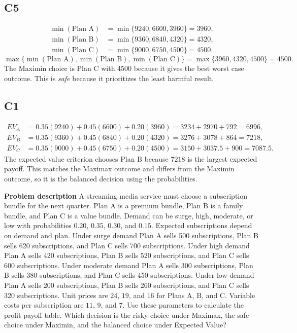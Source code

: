 \begin{ExamProblems}
		\subsection*{C5}
		\[
		\begin{aligned}
		\min(\text{Plan A}) &= \min\{9240,6600,3960\} = 3960,\\
		\min(\text{Plan B}) &= \min\{9360,6840,4320\} = 4320,\\
		\min(\text{Plan C}) &= \min\{9000,6750,4500\} = 4500.
		\end{aligned}
		\]
		\[
		\max\{\min(\text{Plan A}), \min(\text{Plan B}), \min(\text{Plan C})\}
		= \max\{3960, 4320, 4500\}
		= 4500.
		\]
		The Maximin choice is Plan C with 4500 because it gives the best worst case outcome. This is \emph{safe} because it prioritizes the least harmful result.

		\subsection*{C1}
		\[
		\begin{aligned}
		EV_A &= 0.35(9240)+0.45(6600)+0.20(3960)=3234+2970+792=6996,\\
		EV_B &= 0.35(9360)+0.45(6840)+0.20(4320)=3276+3078+864=7218,\\
		EV_C &= 0.35(9000)+0.45(6750)+0.20(4500)=3150+3037.5+900=7087.5.
		\end{aligned}
		\]
			The expected value criterion chooses Plan B because $7218$ is the largest expected payoff. This matches the Maximax outcome and differs from the Maximin outcome, so it is the balanced decision using the probabilities.
	
			\item
			\textbf{Problem description}
			A streaming media service must choose a subscription bundle for the next quarter. Plan A is a premium bundle, Plan B is a family bundle, and Plan C is a value bundle. Demand can be surge, high, moderate, or low with probabilities $0.20$, $0.35$, $0.30$, and $0.15$. Expected subscriptions depend on demand and plan. Under surge demand Plan A sells 500 subscriptions, Plan B sells 620 subscriptions, and Plan C sells 700 subscriptions. Under high demand Plan A sells 420 subscriptions, Plan B sells 520 subscriptions, and Plan C sells 600 subscriptions. Under moderate demand Plan A sells 300 subscriptions, Plan B sells 380 subscriptions, and Plan C sells 450 subscriptions. Under low demand Plan A sells 200 subscriptions, Plan B sells 260 subscriptions, and Plan C sells 320 subscriptions. Unit prices are $24$, $19$, and $16$ for Plans A, B, and C. Variable costs per subscription are $11$, $9$, and $7$. Use these parameters to calculate the profit payoff table. Which decision is the risky choice under Maximax, the safe choice under Maximin, and the balanced choice under Expected Value?
	

\end{ExamProblems}
